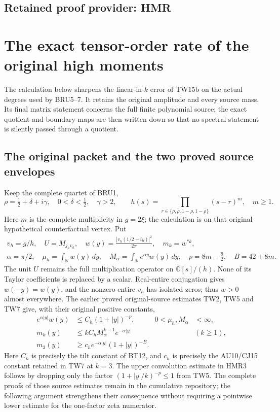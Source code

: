 \documentclass[11pt,a4paper]{article}
\begin{document}

\clearpage
\subsection*{Retained proof provider: HMR}

\section{The exact tensor-order rate of the original high moments}
\label{sec:hmr-original-source}

The calculation below sharpens the linear-in-$k$ error of TW15b on
the actual degrees used by BRU5--7. It retains the original amplitude
and every source mass. Its final matrix statement concerns the full
finite polynomial source; the exact quotient and boundary maps are
then written down so that no spectral statement is silently passed
through a quotient.

\subsection{The original packet and the two proved source envelopes}

Keep the complete quartet of BRU1,
\[
 \rho=\tfrac12+\delta+i\gamma,\quad
 0<\delta<\tfrac12,\quad \gamma>2,\qquad
 h(s)=\prod_{r\in\{\rho,\bar\rho,1-\rho,1-\bar\rho\}}(s-r)^m,
 \quad m\geq1.
 \tag{HMR1}
\]
Here $m$ is the complete multiplicity in $g=2\xi$; the calculation
is on that original hypothetical counterfactual vertex. Put
\[
 \begin{gathered}
 v_h=g/h,\quad U=M_{j_hv_h},\quad
 w(y)=\frac{|v_h(1/2+iy)|^2}{2\pi},\quad
 m_k=w^{*k},\\
 \alpha=\pi/2,\quad
 \mu_h=\int_{\mathbb R}w(y)\,dy,\quad
 M_\alpha=\int_{\mathbb R}e^{\alpha y}w(y)\,dy,\quad
 p=8m-\tfrac92,\quad B=42+8m.
 \end{gathered}\tag{HMR2}
\]
The unit $U$ remains the full multiplication operator on
$\mathbb C[s]/(h)$. None of its Taylor coefficients is replaced by
a scalar. Real-entire conjugation gives $w(-y)=w(y)$, and the
nonzero entire $v_h$ has isolated zeros; thus $w>0$ almost
everywhere. The earlier proved original-source estimates TW2,
TW5 and TW7 give, with their original positive constants,
\[
 \begin{aligned}
 e^{\alpha|y|}w(y)&\leq C_h(1+|y|)^{-p},&
 0<\mu_h,M_\alpha&<\infty,\\
 m_k(y)&\leq kC_hM_\alpha^{k-1}e^{-\alpha|y|}
                  &&(k\geq1),\\
 m_3(y)&\geq c_he^{-\alpha|y|}(1+|y|)^{-B}.
 \end{aligned}\tag{HMR3}
\]
Here $C_h$ is precisely the tilt constant of BT12, and $c_h$
is precisely the AU10/CJ15 constant retained in TW7 at $k=3$.
The upper convolution estimate in HMR3 follows by dropping only
the factor $(1+|y|/k)^{-p}\leq1$ from TW5. The complete proofs
of those source estimates remain in the cumulative repository;
the following argument strengthens their consequence without
requiring a pointwise lower estimate for the one-factor zeta
numerator.
\end{document}
